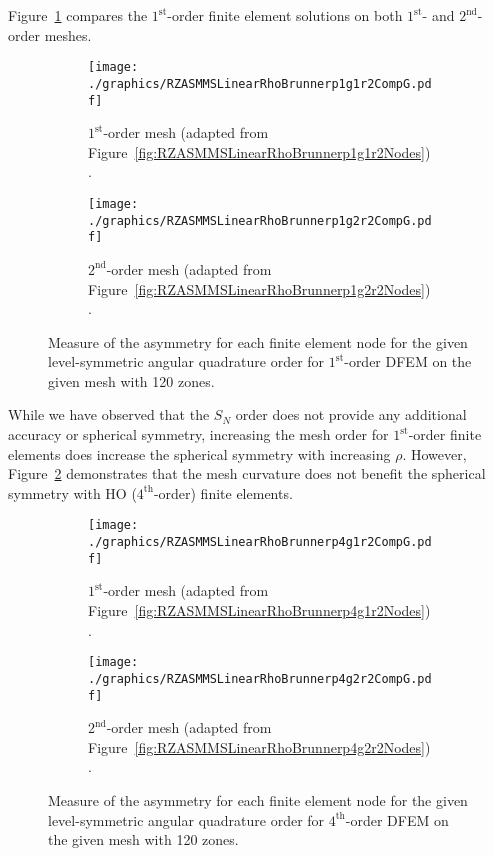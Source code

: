 \documentclass[12pt,letterpaper]{article}
\begin{document}
Figure~\ref{fig:RZASMMSLinearRhoBrunnerp1r2NodesSymmetry} compares the $1^\text{st}$-order finite element solutions on both $1^\text{st}$- and $2^\text{nd}$-order meshes.
%
\begin{figure}[!htb]
\centering
\begin{subfigure}{0.48\textwidth}
\centering
\texttt{[image: ./graphics/RZASMMSLinearRhoBrunnerp1g1r2CompG.pdf]}
\caption{$1^\text{st}$-order mesh (adapted from Figure~\ref{fig:RZASMMSLinearRhoBrunnerp1g1r2Nodes}).}
\end{subfigure}%
\hspace{0.04\textwidth}%
\begin{subfigure}{0.48\textwidth}
\centering
\texttt{[image: ./graphics/RZASMMSLinearRhoBrunnerp1g2r2CompG.pdf]}
\caption{$2^\text{nd}$-order mesh (adapted from Figure~\ref{fig:RZASMMSLinearRhoBrunnerp1g2r2Nodes}).}
\end{subfigure}
\caption{Measure of the asymmetry for each finite element node for the given level-symmetric angular quadrature order for $1^\text{st}$-order DFEM on the given mesh with 120 zones.}
\label{fig:RZASMMSLinearRhoBrunnerp1r2NodesSymmetry}
\end{figure}
%
While we have observed that the $S_N$ order does not provide any additional accuracy or spherical symmetry, increasing the mesh order for $1^\text{st}$-order finite elements does increase the spherical symmetry with increasing $\rho$. However, Figure~\ref{fig:RZASMMSLinearRhoBrunnerp4r2NodesSymmetry}
 demonstrates that the mesh curvature does not benefit the spherical symmetry with HO ($4^\text{th}$-order) finite elements.
\begin{figure}[!htb]
\centering
\begin{subfigure}{0.48\textwidth}
\centering
\texttt{[image: ./graphics/RZASMMSLinearRhoBrunnerp4g1r2CompG.pdf]}
\caption{$1^\text{st}$-order mesh (adapted from Figure~\ref{fig:RZASMMSLinearRhoBrunnerp4g1r2Nodes}).}
\end{subfigure}%
\hspace{0.04\textwidth}%
\begin{subfigure}{0.48\textwidth}
\centering
\texttt{[image: ./graphics/RZASMMSLinearRhoBrunnerp4g2r2CompG.pdf]}
\caption{$2^\text{nd}$-order mesh (adapted from Figure~\ref{fig:RZASMMSLinearRhoBrunnerp4g2r2Nodes}).}
\end{subfigure}
\caption{Measure of the asymmetry for each finite element node for the given level-symmetric angular quadrature order for $4^\text{th}$-order DFEM on the given mesh with 120 zones.}
\label{fig:RZASMMSLinearRhoBrunnerp4r2NodesSymmetry}
\end{figure}
\end{document}
